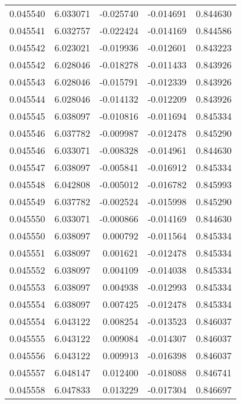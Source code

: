 \begin{tabular}{lrrrr}
0.045540    &  6.033071 & -0.025740 & -0.014691 &             0.844630 \\
0.045541    &  6.032757 & -0.022424 & -0.014169 &             0.844586 \\
0.045542    &  6.023021 & -0.019936 & -0.012601 &             0.843223 \\
0.045542    &  6.028046 & -0.018278 & -0.011433 &             0.843926 \\
0.045543    &  6.028046 & -0.015791 & -0.012339 &             0.843926 \\
0.045544    &  6.028046 & -0.014132 & -0.012209 &             0.843926 \\
0.045545    &  6.038097 & -0.010816 & -0.011694 &             0.845334 \\
0.045546    &  6.037782 & -0.009987 & -0.012478 &             0.845290 \\
0.045546    &  6.033071 & -0.008328 & -0.014961 &             0.844630 \\
0.045547    &  6.038097 & -0.005841 & -0.016912 &             0.845334 \\
0.045548    &  6.042808 & -0.005012 & -0.016782 &             0.845993 \\
0.045549    &  6.037782 & -0.002524 & -0.015998 &             0.845290 \\
0.045550    &  6.033071 & -0.000866 & -0.014169 &             0.844630 \\
0.045550    &  6.038097 &  0.000792 & -0.011564 &             0.845334 \\
0.045551    &  6.038097 &  0.001621 & -0.012478 &             0.845334 \\
0.045552    &  6.038097 &  0.004109 & -0.014038 &             0.845334 \\
0.045553    &  6.038097 &  0.004938 & -0.012993 &             0.845334 \\
0.045554    &  6.038097 &  0.007425 & -0.012478 &             0.845334 \\
0.045554    &  6.043122 &  0.008254 & -0.013523 &             0.846037 \\
0.045555    &  6.043122 &  0.009084 & -0.014307 &             0.846037 \\
0.045556    &  6.043122 &  0.009913 & -0.016398 &             0.846037 \\
0.045557    &  6.048147 &  0.012400 & -0.018088 &             0.846741 \\
0.045558    &  6.047833 &  0.013229 & -0.017304 &             0.846697 \\

\end{tabular}
